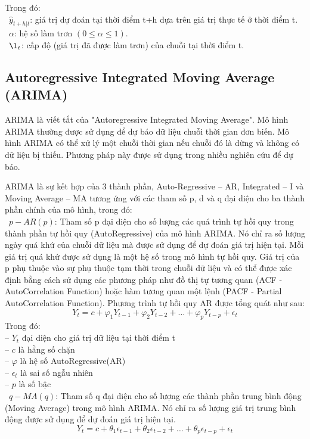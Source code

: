\documentclass[conference]{IEEEtran}
\begin{document}
Trong đó:\\
\indent\textbullet\ \(\hat{y}_{t+h|t} \): giá trị dự đoán tại thời điểm t+h dựa trên giá trị thực tế ở thời điểm t.\\
\indent\textbullet\ \(\alpha\): hệ số làm trơn \((0\le\alpha\le1)\).\\
\indent\textbullet\ \(\l_t \): cấp độ (giá trị đã được làm trơn) của chuỗi tại thời điểm t.\\

\vspace{-5mm}
\subsection{Autoregressive Integrated Moving Average (ARIMA)}

ARIMA là viết tắt của "Autoregressive Integrated Moving Average". Mô hình ARIMA thường được sử dụng để dự báo dữ liệu chuỗi thời gian đơn biến. Mô hình ARIMA có thể xử lý một chuỗi thời gian nếu chuỗi đó là dừng và không có dữ liệu bị thiếu. Phương pháp này được sử dụng trong nhiều nghiên cứu để dự báo.

ARIMA là sự kết hợp của 3 thành phần, Auto-Regressive – AR, Integrated – I và Moving Average – MA tương ứng với các tham số p, d và q đại diện cho ba thành phần chính của mô hình, trong đó:
\\
\indent\textbullet\ \(p-AR(p)\): Tham số p đại diện cho số lượng các quá trình tự hồi quy trong thành phần tự hồi quy (AutoRegressive) của mô hình ARIMA. Nó chỉ ra số lượng ngày quá khứ của chuỗi dữ liệu mà được sử dụng để dự đoán giá trị hiện tại. Mỗi giá trị quá khứ được sử dụng là một hệ số trong mô hình tự hồi quy. Giá trị của p phụ thuộc vào sự phụ thuộc tạm thời trong chuỗi dữ liệu và có thể được xác định bằng cách sử dụng các phương pháp như đồ thị tự tương quan (ACF - AutoCorrelation Function) hoặc hàm tương quan một lệnh (PACF - Partial AutoCorrelation Function). Phương trình tự hồi quy AR được tổng quát như sau:\\
\vspace{-4mm}
\[
    Y_t = c + \varphi_1 Y_{t-1} + \varphi_2 Y_{t-2} + \ldots + \varphi_p Y_{t-p} + \epsilon_t
\]
Trong đó: \\
\indent -- \(Y_t\) đại diện cho giá trị dữ liệu tại thời điểm t\\
\indent -- \(c\) là hằng số chặn\\
\indent -- \(\varphi\) là hệ số AutoRegressive(AR)\\
\indent -- \(\epsilon_t\) là sai số ngẫu nhiên \\
\indent -- \(p\) là số bậc \\
\indent\textbullet\ \(q-MA(q)\): Tham số q đại diện cho số lượng các thành phần trung bình động (Moving Average) trong mô hình ARIMA. Nó chỉ ra số lượng giá trị trung bình động được sử dụng để dự đoán giá trị hiện tại.\\
\vspace{-4mm}
\[
    Y_t = c + \theta_1 \epsilon_{t-1} + \theta_2 \epsilon_{t-2} + \ldots + \theta_p \epsilon_{t-p} + \epsilon_t
\]
\end{document}
